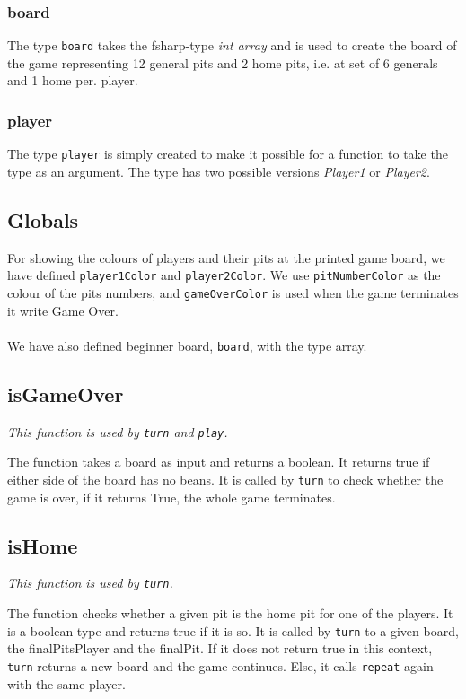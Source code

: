 \documentclass[a4paper]{report}
\begin{document}
\subsubsection*{board}
The type \texttt{board} takes the fsharp-type \textsl{int array} and is used to create the board of the game representing 12 general pits and 2 home pits, i.e. at set of 6 generals and 1 home per. player.

\subsubsection*{player}
The type \texttt{player} is simply created to make it possible for a function to take the type as an argument. The type has two possible versions \textsl{Player1} or \textsl{Player2}.
\subsection*{Globals}
For showing the colours of players and their pits at the printed game board, we have defined \texttt{player1Color} and \texttt{player2Color}. We use \texttt{pitNumberColor} as the colour of the pits numbers, and \texttt{gameOverColor} is used when the game terminates it write Game Over.
\\\\
We have also defined beginner board, \texttt{board}, with the type array.

\subsection*{isGameOver}
{\it This function is used by \texttt{turn} and \texttt{play}.}

The function takes a board as input and returns a boolean. It returns true if either side of the board has no beans. It is called by \texttt{turn} to check whether the game is over, if it returns True, the whole game terminates.

\subsection*{isHome} 
{\it This function is used by \texttt{turn}.}

The function checks whether a given pit is the home pit for one of the players. It is a boolean type and returns true if it is so.
It is called by \texttt{turn} to a given board, the finalPitsPlayer and the finalPit. If it does not return true in this context, \texttt{turn} returns a new board and the game continues. Else, it calls \texttt{repeat} again with the same player.
\end{document}
